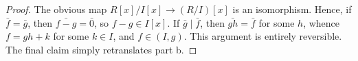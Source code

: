 \begin{proof}
	The obvious map $R[x]/I[x] \to (R/I)[x]$ is an isomorphism. Hence, if $\bar{f} = \bar{g}$, then $\bar{f-g} = \bar{0}$, so $f-g \in I[x]$. If $\bar{g} \mid \bar{f}$, then $\bar{gh} = \bar{f}$ for some $h$, whence $f = gh+k$ for some $k \in I$, and $f \in (I,g)$. This argument is entirely reversible. The final claim simply retranslates part b.
\end{proof}
